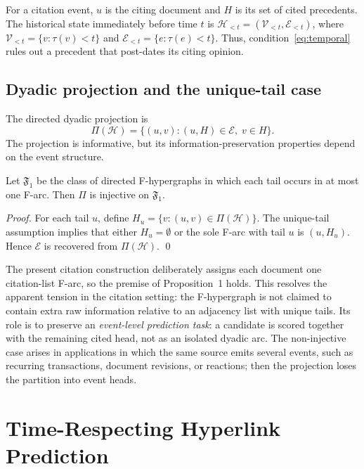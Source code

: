 \documentclass{svproc}
\newcommand{\Hcal}{\mathcal{H}}
\newcommand{\Ecal}{\mathcal{E}}
\newcommand{\Vcal}{\mathcal{V}}
\begin{document}
For a citation event, $u$ is the citing document and $H$ is its set of cited precedents. The historical state immediately before time $t$ is $\Hcal_{<t}=(\Vcal_{<t},\Ecal_{<t})$, where $\Vcal_{<t}=\{v:\tau(v)<t\}$ and $\Ecal_{<t}=\{e:\tau(e)<t\}$. Thus, condition~\eqref{eq:temporal} rules out a precedent that post-dates its citing opinion.

\subsection{Dyadic projection and the unique-tail case}

The directed dyadic projection is
\begin{equation}
\Pi(\Hcal)=\{(u,v):(u,H)\in\Ecal,\;v\in H\}.
\label{eq:projection}
\end{equation}
The projection is informative, but its information-preservation properties depend on the event structure.

\begin{proposition}
Let $\mathfrak{F}_1$ be the class of directed F-hypergraphs in which each tail occurs in at most one F-arc. Then $\Pi$ is injective on $\mathfrak{F}_1$.
\end{proposition}
\begin{proof}
For each tail $u$, define $H_u=\{v:(u,v)\in\Pi(\Hcal)\}$. The unique-tail assumption implies that either $H_u=\emptyset$ or the sole F-arc with tail $u$ is $(u,H_u)$. Hence $\Ecal$ is recovered from $\Pi(\Hcal)$. \qed
\end{proof}

The present citation construction deliberately assigns each document one citation-list F-arc, so the premise of Proposition~1 holds. This resolves the apparent tension in the citation setting: the F-hypergraph is not claimed to contain extra raw information relative to an adjacency list with unique tails. Its role is to preserve an \emph{event-level prediction task}: a candidate is scored together with the remaining cited head, not as an isolated dyadic arc. The non-injective case arises in applications in which the same source emits several events, such as recurring transactions, document revisions, or reactions; then the projection loses the partition into event heads.

\section{Time-Respecting Hyperlink Prediction}
\label{sec:task}
\end{document}
